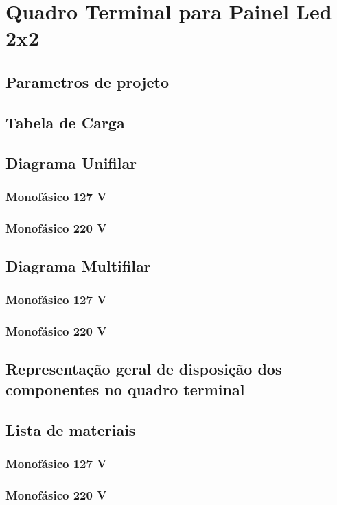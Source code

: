 \section{Quadro Terminal para Painel Led 2x2}
\subsection{Parametros de projeto}
\subsection{Tabela de Carga}
\subsection{Diagrama Unifilar}
\subsubsection{Monofásico 127 V}
\subsubsection{Monofásico 220 V}

\subsection{Diagrama Multifilar}
\subsubsection{Monofásico 127 V}
\subsubsection{Monofásico 220 V}

\subsection{Representação geral de disposição dos componentes no quadro terminal}

\subsection{Lista de materiais}
\subsubsection{Monofásico 127 V}
\subsubsection{Monofásico 220 V}